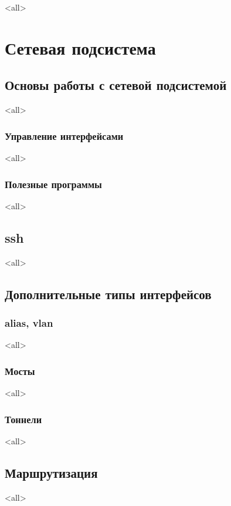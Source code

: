 \mode<all>{}

\chapter{Сетевая подсистема}

\section{Основы работы с сетевой подсистемой}

\mode<all>{}

\subsection{Управление интерфейсами}
\mode<all>{}

\subsection{Полезные программы}
\mode<all>{}

\section{ssh}
\mode<all>{}


\section{Дополнительные типы интерфейсов}

\subsection{alias, vlan}
\mode<all>{}
\subsection{Мосты}
\mode<all>{}
\subsection{Тоннели}
\mode<all>{}

\section{Маршрутизация}
\mode<all>{}


